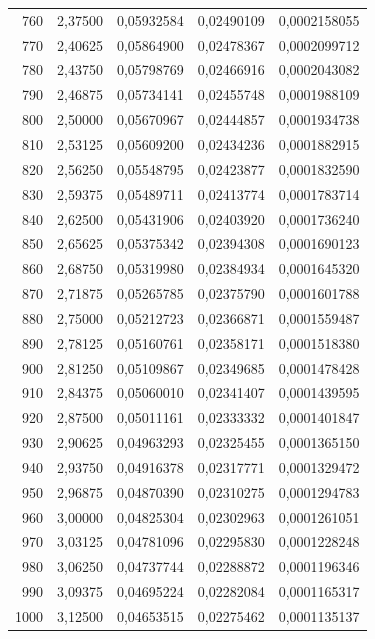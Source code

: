 \begin{longtable}{rrrrr}
760 & 2,37500 & 0,05932584 & 0,02490109 & 0,0002158055\\
770 & 2,40625 & 0,05864900 & 0,02478367 & 0,0002099712\\
780 & 2,43750 & 0,05798769 & 0,02466916 & 0,0002043082\\
790 & 2,46875 & 0,05734141 & 0,02455748 & 0,0001988109\\
800 & 2,50000 & 0,05670967 & 0,02444857 & 0,0001934738\\
810 & 2,53125 & 0,05609200 & 0,02434236 & 0,0001882915\\
820 & 2,56250 & 0,05548795 & 0,02423877 & 0,0001832590\\
830 & 2,59375 & 0,05489711 & 0,02413774 & 0,0001783714\\
840 & 2,62500 & 0,05431906 & 0,02403920 & 0,0001736240\\
850 & 2,65625 & 0,05375342 & 0,02394308 & 0,0001690123\\
860 & 2,68750 & 0,05319980 & 0,02384934 & 0,0001645320\\
870 & 2,71875 & 0,05265785 & 0,02375790 & 0,0001601788\\
880 & 2,75000 & 0,05212723 & 0,02366871 & 0,0001559487\\
890 & 2,78125 & 0,05160761 & 0,02358171 & 0,0001518380\\
900 & 2,81250 & 0,05109867 & 0,02349685 & 0,0001478428\\
910 & 2,84375 & 0,05060010 & 0,02341407 & 0,0001439595\\
920 & 2,87500 & 0,05011161 & 0,02333332 & 0,0001401847\\
930 & 2,90625 & 0,04963293 & 0,02325455 & 0,0001365150\\
940 & 2,93750 & 0,04916378 & 0,02317771 & 0,0001329472\\
950 & 2,96875 & 0,04870390 & 0,02310275 & 0,0001294783\\
960 & 3,00000 & 0,04825304 & 0,02302963 & 0,0001261051\\
970 & 3,03125 & 0,04781096 & 0,02295830 & 0,0001228248\\
980 & 3,06250 & 0,04737744 & 0,02288872 & 0,0001196346\\
990 & 3,09375 & 0,04695224 & 0,02282084 & 0,0001165317\\
1000 & 3,12500 & 0,04653515 & 0,02275462 & 0,0001135137\\
\end{longtable}
